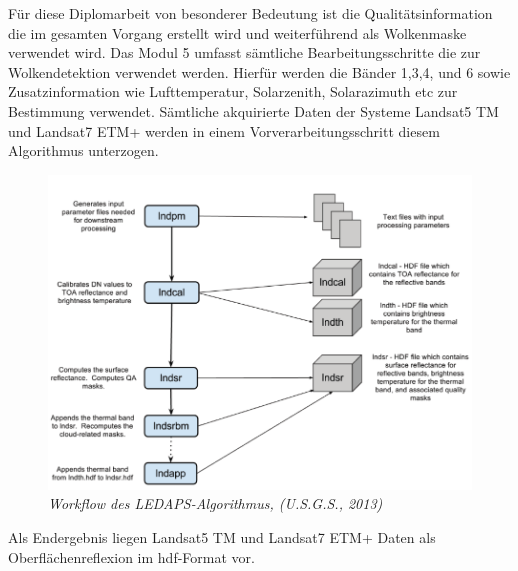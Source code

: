 \documentclass[11pt]{report}
\begin{document}
Für diese Diplomarbeit von besonderer Bedeutung ist die Qualitätsinformation die im gesamten Vorgang erstellt wird und weiterführend als Wolkenmaske verwendet wird. Das Modul 5 umfasst sämtliche Bearbeitungsschritte die zur Wolkendetektion verwendet werden. Hierfür werden die Bänder 1,3,4, und 6 sowie Zusatzinformation wie Lufttemperatur, Solarzenith, Solarazimuth etc zur Bestimmung verwendet. Sämtliche akquirierte Daten der Systeme Landsat5 TM und Landsat7 ETM+ werden in einem Vorverarbeitungsschritt diesem Algorithmus unterzogen. 
\begin{figure}[H]
\centering
\includegraphics[scale=0.6]{./Grafiken/LEDAPS/Algorithm_workflow_LEDAPS.PNG}
\caption{\textit{Workflow des LEDAPS-Algorithmus, (U.S.G.S., 2013)}}
\end{figure}


Als Endergebnis liegen Landsat5 TM und Landsat7 ETM+ Daten als Oberflächenreflexion im hdf-Format vor. 

\end{document}
